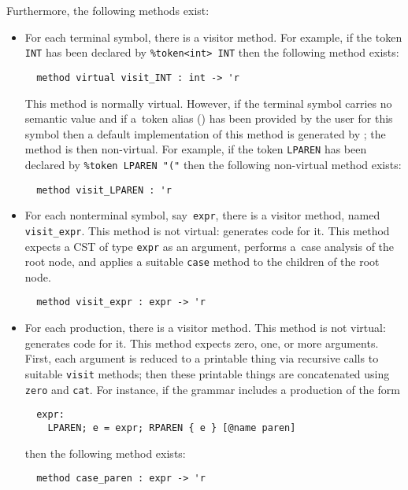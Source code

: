 Furthermore, the following methods exist:
%
\begin{itemize}
\item
For each terminal symbol,
there is a visitor method.
%
For example, if the token \texttt{INT} has been declared by
\verb+%token<int> INT+
then the following method exists:
\begin{verbatim}
  method virtual visit_INT : int -> 'r
\end{verbatim}
%
This method is normally virtual.
However,
if the terminal symbol carries no semantic value
and if a~token alias ()
has been provided by the user for this symbol
then a default implementation of this method
is generated by \menhir;
the method is then non-virtual.
For example, if the token \texttt{LPAREN} has been declared by
\verb+%token LPAREN "("+
then the following non-virtual method exists:
\begin{verbatim}
  method visit_LPAREN : 'r
\end{verbatim}
\item
For each nonterminal symbol, say~\texttt{expr},
there is a visitor method,
named \texttt{visit\_expr}.
This method is not virtual: \menhir generates code for it.
This method expects a CST of type \texttt{expr}
as an argument,
performs a~case analysis of the root node,
and applies a suitable \texttt{case} method
to the children of the root node.
\begin{verbatim}
  method visit_expr : expr -> 'r
\end{verbatim}
\item
For each production,
there is a visitor method.
This method is not virtual: \menhir generates code for it.
This method expects zero, one, or more arguments.
First, each argument is reduced to a printable thing
via recursive calls to suitable \texttt{visit} methods;
then these printable things are concatenated
using \texttt{zero} and \texttt{cat}.
%
For instance, if the grammar includes a production of the form
\begin{verbatim}
  expr:
    LPAREN; e = expr; RPAREN { e } [@name paren]
\end{verbatim}
then the following method exists:
\begin{verbatim}
  method case_paren : expr -> 'r
\end{verbatim}
\end{itemize}
